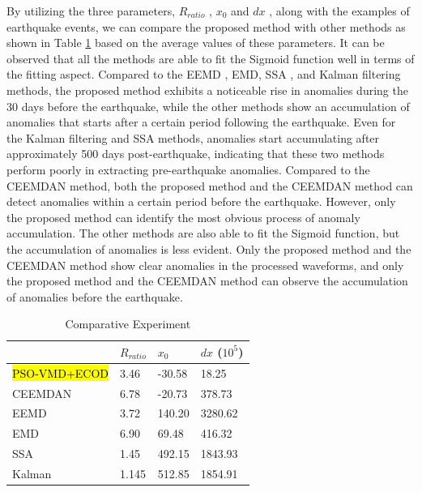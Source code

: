 \documentclass[3p,authoryear,preprint,12pt]{elsarticle}
\begin{document}
By utilizing the three parameters, $R_{ratio}$ , $x_0$ and $dx$ , along with the examples of earthquake events, we can compare the proposed method with other methods as shown in Table \ref{tab:Comparative Experiment} based on the average values of these parameters. It can be observed that all the methods are able to fit the Sigmoid function well in terms of the fitting aspect. Compared to the EEMD \citep{BarmanDetectionearthquakeinduced2016}, EMD\citep{yangEMDBasedStatistical2023}, SSA \citep{rasheedSingularSpectralControl2023}, and Kalman filtering \citep{kitaharaAdaptiveBayesianFilter2023} methods, the proposed method exhibits a noticeable rise in anomalies during the 30 days before the earthquake, while the other methods show an accumulation of anomalies that starts after a certain period following the earthquake. Even for the Kalman filtering and SSA methods, anomalies start accumulating after approximately 500 days post-earthquake, indicating that these two methods perform poorly in extracting pre-earthquake anomalies. Compared to the CEEMDAN \citep{ChenDynamicmonitoringoffshore2021} method, both the proposed method and the CEEMDAN method can detect anomalies within a certain period before the earthquake. However, only the proposed method can identify the most obvious process of anomaly accumulation. The other methods are also able to fit the Sigmoid function, but the accumulation of anomalies is less evident. Only the proposed method and the CEEMDAN method show clear anomalies in the processed waveforms, and only the proposed method and the CEEMDAN method can observe the accumulation of anomalies before the earthquake.
\begin{table}[htbp]
	\centering
	\caption{Comparative Experiment}
	\label{tab:Comparative Experiment}
	\begin{tabular}{@{}llll@{}}
		\toprule
		& \textbf{$R_{ratio}$} & \textbf{$x_0$} & \textbf{$dx$ ($10^5$)} \\ \midrule
		\hl{PSO-VMD+ECOD}    & 3.46                 & -30.58         & 18.25                  \\
		CEEMDAN\citep{ChenDynamicmonitoringoffshore2021} &  6.78                   & -20.73               &   378.73        \\		
		EEMD\citep{BarmanDetectionearthquakeinduced2016}    & 3.72                 & 140.20         & 3280.62                \\ 
		EMD\citep{yangEMDBasedStatistical2023}     & 6.90                 & 69.48          & 416.32                 \\
		SSA\citep{rasheedSingularSpectralControl2023}     & 1.45                 & 492.15         & 1843.93                \\
		Kalman\citep{kitaharaAdaptiveBayesianFilter2023}  & 1.145                & 512.85         & 1854.91                \\
		\bottomrule
	\end{tabular}
\end{table}    
\end{document}
